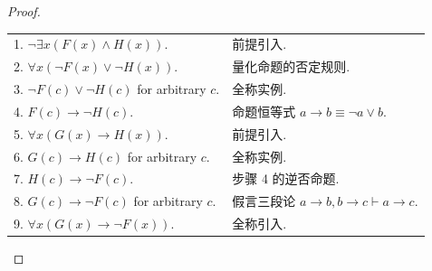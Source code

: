 \documentclass[10pt,UTF8]{book} %
\begin{document}
\begin{example}
\begin{proof}
\begin{enumerate}[label={$\left.\arabic*\right)$}, itemsep=0pt]
{\begin{longtable}{p{}p{}}
            1. $\lnot \exists x \left(
                F(x) \wedge H(x)
            \right)$. & 前提引入. \\ 
            2. $\forall x \left(
                \lnot F(x) \vee \lnot H(x)
            \right)$. & 量化命题的否定规则. \\ 
            3. $\lnot F(c) \vee \lnot H(c)$ for arbitrary $c$.
            & 全称实例. \\
            4. $F(c) \to \lnot H(c)$. & 命题恒等式 $a \to b \equiv \lnot a \vee b$. \\ 
            5. $\forall x \left(
                G(x) \to H(x)
            \right)$. & 前提引入. \\ 
            6. $G(c) \to H(c)$ for arbitrary $c$. & 全称实例. \\
            7. $H(c) \to \lnot F(c)$. & 步骤 4 的逆否命题. \\ 
            8. $G(c) \to \lnot F(c)$ for arbitrary $c$. & 假言三段论 $a \to b, b \to c \vdash a \to c$. \\ 
            9. $\forall x \left(
                G(x) \to \lnot F(x)
            \right)$. & 全称引入. \\
            \end{longtable}}
        \end{enumerate}
    \end{proof}
\end{example}
\end{document}
